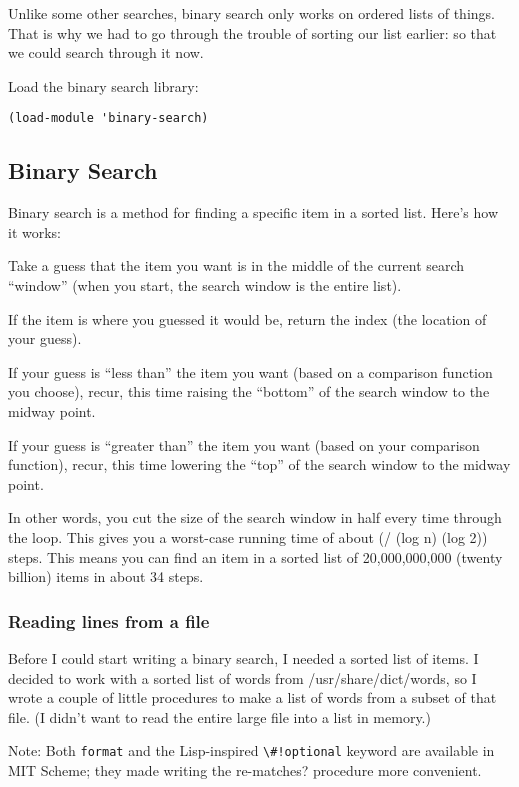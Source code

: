 \documentclass[12pt,openright,draft]{book}
\begin{document}
Unlike some other searches, binary search only works on ordered
lists of things.  That is why we had to go through the trouble of
sorting our list earlier: so that we could search through it now.

Load the binary search library:

\begin{verbatim}
(load-module 'binary-search)
\end{verbatim}

\subsection{Binary Search}

Binary search is a method for finding a specific item in a sorted
list. Here's how it works:

Take a guess that the item you want is in the middle of the current
search ``window'' (when you start, the search window is the entire
list).

If the item is where you guessed it would be, return the index (the
location of your guess).

If your guess is ``less than'' the item you want (based on a
comparison function you choose), recur, this time raising the
``bottom'' of the search window to the midway point.

If your guess is ``greater than'' the item you want (based on your
comparison function), recur, this time lowering the ``top'' of the
search window to the midway point.

In other words, you cut the size of the search window in half every
time through the loop. This gives you a worst-case running time of
about (/ (log n) (log 2)) steps. This means you can find an item in a
sorted list of 20,000,000,000 (twenty billion) items in about 34
steps.

\subsubsection{Reading lines from a file}

Before I could start writing a binary search, I needed a sorted list
of items. I decided to work with a sorted list of words from
/usr/share/dict/words, so I wrote a couple of little procedures to
make a list of words from a subset of that file. (I didn't want to
read the entire large file into a list in memory.)

Note: Both \verb|format| and the Lisp-inspired \verb|\#!optional|
keyword are available in MIT Scheme; they made writing the re-matches?
procedure more convenient.
\end{document}
